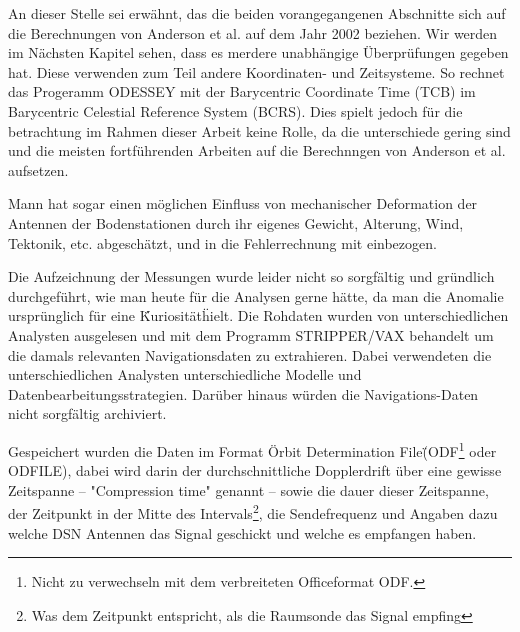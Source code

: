 An dieser Stelle sei erwähnt, das die beiden vorangegangenen Abschnitte sich auf die Berechnungen von Anderson et al. auf dem Jahr 2002 beziehen.
Wir werden im Nächsten Kapitel sehen, dass es merdere unabhängige Überprüfungen gegeben hat.
Diese verwenden zum Teil andere Koordinaten- und Zeitsysteme.
So rechnet das Progeramm ODESSEY mit der Barycentric Coordinate Time (TCB) im Barycentric Celestial Reference System (BCRS).
Dies spielt jedoch für die betrachtung im Rahmen dieser Arbeit keine Rolle, da die unterschiede gering sind und die meisten fortführenden Arbeiten auf die Berechnngen von Anderson et al. aufsetzen.	%

Mann hat sogar einen möglichen Einfluss von mechanischer Deformation der Antennen der Bodenstationen durch ihr eigenes Gewicht,
Alterung, Wind, Tektonik, etc. abgeschätzt, und in die Fehlerrechnung mit einbezogen.\cite{Dittus2006} %


Die Aufzeichnung der Messungen wurde leider nicht so sorgfältig und gründlich durchgeführt, wie man heute für die Analysen gerne hätte, da man die Anomalie ursprünglich für eine \"Kuriosität\" hielt.\cite{Nieto2005} Die Rohdaten wurden von unterschiedlichen Analysten ausgelesen und mit dem Programm STRIPPER/VAX behandelt um die damals relevanten Navigationsdaten zu extrahieren.\cite{Nieto2005} %
Dabei verwendeten die unterschiedlichen Analysten unterschiedliche Modelle und Datenbearbeitungsstrategien.\cite{Nieto2005}
Darüber hinaus würden die Navigations-Daten nicht sorgfältig archiviert.\cite{Nieto2005}


Gespeichert wurden die Daten im Format \"Orbit Determination File\" (ODF\footnote{Nicht zu verwechseln mit dem verbreiteten Officeformat ODF.} oder ODFILE), dabei wird darin der durchschnittliche Dopplerdrift über eine gewisse Zeitspanne
– "Compression time" genannt – sowie die dauer dieser Zeitspanne, der Zeitpunkt in der Mitte des Intervals\footnote{Was dem Zeitpunkt entspricht, als die Raumsonde das Signal empfing\cite{Levy2008}}, die Sendefrequenz und
Angaben dazu welche DSN Antennen das Signal geschickt und welche es empfangen haben.\cite{Levy2008} 	%



